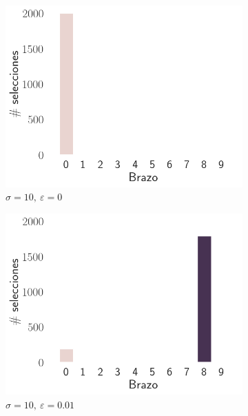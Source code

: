 \documentclass[12pt]{article}
\begin{document}
\begin{figure}[H]
        \begin{subfigure}[H]{0.3\textwidth}
            \includegraphics[width=\textwidth]{../img/2000/arm_sigma_10_epsilon_0}
            \caption{$\sigma=10 ,\ \varepsilon=0$}
            \label{fig:arms_selected_10_0}
        \end{subfigure}
        \begin{subfigure}[H]{0.3\textwidth}
            \includegraphics[width=\textwidth]{../img/2000/arm_sigma_10_epsilon_0.01}
            \caption{$\sigma=10 ,\ \varepsilon=0.01$}
            \label{fig:arms_selected_10_0.01}
        \end{subfigure}
        \begin{subfigure}[H]{0.3\textwidth}

\end{subfigure}
\end{figure}
\end{document}
